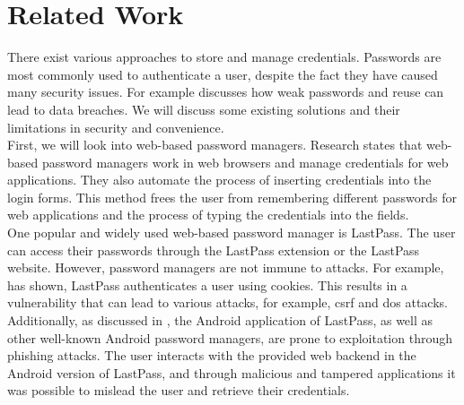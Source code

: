 \section{Related Work} \label{relwork}
There exist various approaches to store and manage credentials. Passwords are most commonly used to authenticate a user, despite the fact they have caused many security issues. For example \cite{WeakPasswords} discusses how weak passwords and reuse can lead to data breaches. We will discuss some existing solutions and their limitations in security and convenience. \\

First, we will look into web-based password managers. Research \cite{LiHAS14} states that web-based password managers work in web browsers and manage credentials for web applications. They also automate the process of inserting credentials into the login forms. This method frees the user from remembering different passwords for web applications and the process of typing the credentials into the fields. \\
One popular and widely used web-based password manager is LastPass. The user can access their passwords through the LastPass extension or the LastPass website. However, password managers are not immune to attacks. For example, \cite{LiHAS14} has shown, LastPass authenticates a user using cookies. This results in a vulnerability that can lead to various attacks, for example, \gls{csrf} and \gls{dos} attacks. Additionally, as discussed in \cite{AndroidPhishing}, the Android application of LastPass, as well as other well-known Android password managers, are prone to exploitation through phishing attacks. The user interacts with the provided web backend in the Android version of LastPass, and through malicious and tampered applications it was possible to mislead the user and retrieve their credentials. \\

